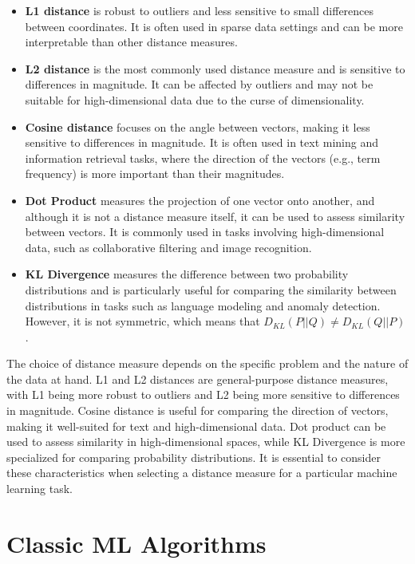 \documentclass[12pt]{article}
\begin{document}
\begin{itemize}
\item \textbf{L1 distance} is robust to outliers and less sensitive to small differences between coordinates. It is often used in sparse data settings and can be more interpretable than other distance measures.
\item \textbf{L2 distance} is the most commonly used distance measure and is sensitive to differences in magnitude. It can be affected by outliers and may not be suitable for high-dimensional data due to the curse of dimensionality.
\item \textbf{Cosine distance} focuses on the angle between vectors, making it less sensitive to differences in magnitude. It is often used in text mining and information retrieval tasks, where the direction of the vectors (e.g., term frequency) is more important than their magnitudes.

\item \textbf{Dot Product} measures the projection of one vector onto another, and although it is not a distance measure itself, it can be used to assess similarity between vectors. It is commonly used in tasks involving high-dimensional data, such as collaborative filtering and image recognition.

\item \textbf{KL Divergence} measures the difference between two probability distributions and is particularly useful for comparing the similarity between distributions in tasks such as language modeling and anomaly detection. However, it is not symmetric, which means that $D_{KL}(P || Q) \neq D_{KL}(Q || P)$.
\end{itemize}

The choice of distance measure depends on the specific problem and the nature of the data at hand. L1 and L2 distances are general-purpose distance measures, with L1 being more robust to outliers and L2 being more sensitive to differences in magnitude. Cosine distance is useful for comparing the direction of vectors, making it well-suited for text and high-dimensional data. Dot product can be used to assess similarity in high-dimensional spaces, while KL Divergence is more specialized for comparing probability distributions. It is essential to consider these characteristics when selecting a distance measure for a particular machine learning task.

\section{Classic ML Algorithms}
\end{document}
